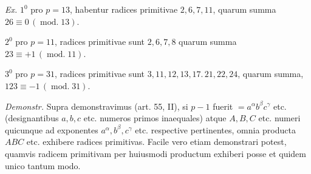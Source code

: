 \emph{Ex.} $1^0$ pro $p=13$, habentur radices primitivae $2,6,7,11$, quarum summa $26\equiv0\,(\operatorname{mod.}13)$.

$2^0$ pro $p=11$, radices primitivae sunt $2,6,7,8$ quarum summa $23\equiv+1\,(\operatorname{mod.}11)$.

$3^0$ pro $p=31$, radices primitivae sunt $3,11,12,13,17.\,21,22,24$, quarum summa, $123\equiv-1\,(\operatorname{mod.}31)$.

\emph{Demonstr.} Supra demonstravimus (art. 55, II), si $p-1$ fuerit $=a^{\alpha}b^{\beta}c^{\gamma}$ etc. (designantibus $a,b,c$ etc. numeros primos inaequales) atque $A,B,C$ etc. numeri quicunque ad exponentes $a^{\alpha},b^{\beta},c^{\gamma}$ etc. respective pertinentes, omnia producta $ABC$ etc. exhibere radices primitivas. Facile vero etiam demonstrari potest, quamvis radicem primitivam per huiusmodi productum exhiberi posse et quidem unico tantum modo.

